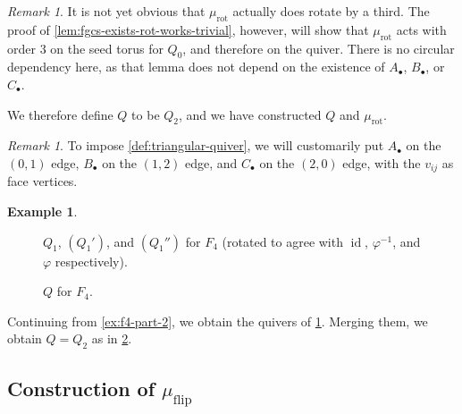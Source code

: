 \documentclass{amsart}
\theoremstyle{plain}
\theoremstyle{definition}
\newtheorem{example}[theorem]{Example}
\theoremstyle{remark}
\newtheorem{remark}[theorem]{Remark}
\newcommand{\muflip}{{\mu_{\text{flip}}}}
\newcommand{\murot}{{\mu_{\text{rot}}}}
\DeclareMathOperator{\id}{id}
\begin{document}
  \begin{remark}
    \label{rem:yes-using-murot-is-justified}
    It is not yet obvious that $\murot$ actually does rotate by a third.
    The proof of \cref{lem:fgcs-exists-rot-works-trivial}, however, will
    show that $\murot$ acts with order $3$ on the seed torus for $Q_0$,
    and therefore on the quiver. There is no circular dependency here,
    as that lemma does not depend on the existence of $A_{\bullet}$,
    $B_{\bullet}$, or $C_{\bullet}$.
  \end{remark}

  We therefore define $Q$ to be $Q_2$, and we have constructed $Q$ and
  $\murot$.

  \begin{remark}
    \label{rem:Q-is-visually-triangular}
    To impose \cref{def:triangular-quiver}, we will customarily put
    $A_{\bullet}$ on the $(0,1)$ edge, $B_{\bullet}$ on the $(1,2)$
    edge, and $C_{\bullet}$ on the $(2,0)$ edge, with the $v_{ij}$ as
    face vertices.
  \end{remark}

  \begin{example}
    \label{ex:f4-part-3}

    \begin{figure}
      \centering 

      \caption{$Q_1$, $(Q_1')$, and $(Q_1'')$ for $F_4$ (rotated to
        agree with $\id$, $\varphi^{-1}$, and $\varphi$ respectively).
        \label{fig:rect-F4-Q1s}
      }
    \end{figure}

    \begin{figure}
      \centering 

      \caption{$Q$ for $F_4$.
        \label{fig:QF4}
      }
    \end{figure}

    Continuing from \cref{ex:f4-part-2}, we obtain the quivers of
    \cref{fig:rect-F4-Q1s}. Merging them, we obtain $Q = Q_2$ as in
    \cref{fig:QF4}.

  \end{example}

  \subsection{Construction of \texorpdfstring{$\muflip$}{mu\_\{flip\}}}

  \label{sec:constructing-muflip}
\end{document}
